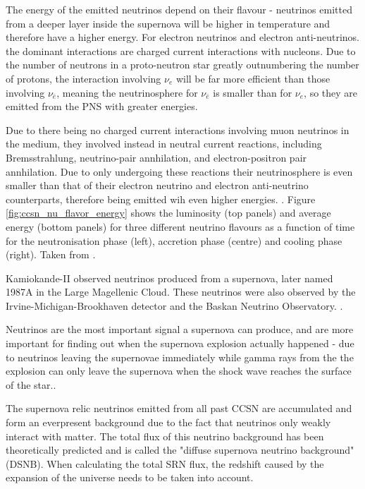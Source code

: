 The energy of the emitted neutrinos depend on their flavour - neutrinos emitted from a deeper layer inside the supernova will be higher in temperature and therefore have a higher energy. For electron neutrinos and electron anti-neutrinos. the dominant interactions are charged current interactions with nucleons. Due to the number of neutrons in a proto-neutron star greatly outnumbering the number of protons, the interaction involving $\nu_{e}$ will be far more efficient than those involving $\nu_{\bar{e}}$, meaning the neutrinosphere for $\nu_{\bar{e}}$ is smaller than for $\nu_{e}$, so they are emitted from the PNS with greater energies. 

Due to there being no charged current interactions involving muon neutrinos in the medium, they involved instead in neutral current reactions, including Bremsstrahlung, neutrino-pair annhilation, and electron-positron pair annhilation. Due to only undergoing these reactions their neutrinosphere is even smaller than that of their electron neutrino and electron anti-neutrino counterparts, therefore being emitted wih even higher energies. \cite{nagakuraNonthermalNeutrinosCreated2021}. Figure \ref{fig:ccsn_nu_flavor_energy} shows the luminosity (top panels) and average energy (bottom panels) for three different neutrino flavours as a function of time for the neutronisation phase (left), accretion phase (centre) and cooling phase (right). Taken from \cite{chakrabortyObservingSupernovaNeutrino2014}.

Kamiokande-II observed neutrinos produced from a supernova, later named 1987A in the Large Magellenic Cloud. These neutrinos were also observed by the Irvine-Michigan-Brookhaven detector and the Baskan Neutrino Observatory. \cite{hirataObservationNeutrinoBurst1987}.

Neutrinos are the most important signal a supernova can produce, and are more important for finding out when the supernova explosion actually happened - due to neutrinos leaving the supernovae immediately while gamma rays from the the explosion can only leave the supernova when the shock wave reaches the surface of the star.\cite{betheSupernovaMechanisms1990}.

The supernova relic neutrinos emitted from all past CCSN are accumulated and form an everpresent background due to the fact that neutrinos only weakly interact with matter. The total flux of this neutrino background has been theoretically predicted and is called the "diffuse supernova neutrino background" (DSNB). When calculating the total SRN flux, the redshift caused by the expansion of the universe needs to be taken into account.

